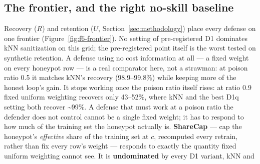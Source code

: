 \subsection{The frontier, and the right no-skill baseline}
Recovery ($R$) and retention ($U$, Section~\ref{sec:methodology}) place every defense on one
frontier (Figure~\ref{fig:f6-frontier}). No setting of pre-registered D1 dominates kNN
sanitization on this grid; the pre-registered point itself is the worst tested on synthetic
retention. A defense using no cost information at all — a fixed weight on every honeypot row —
is a real comparator here, not a strawman: at poison ratio 0.5 it matches kNN's recovery
(98.9--99.8\%) while keeping more of the honest loop's gain. It stops working once the poison
ratio itself rises: at ratio 0.9 fixed uniform weighting recovers only 43--52\%, where kNN and
the best D1q setting both recover \textasciitilde99\%. A defense that must work at a poison
ratio the defender does not control cannot be a single fixed weight; it has to respond to how
much of the training set the honeypot actually is.
\textbf{ShareCap} — cap the honeypot's \emph{effective} share of the training set at $c$,
recomputed every retrain, rather than fix every row's weight — responds to exactly the quantity
fixed uniform weighting cannot see. It is \textbf{undominated} by every D1 variant, kNN and
